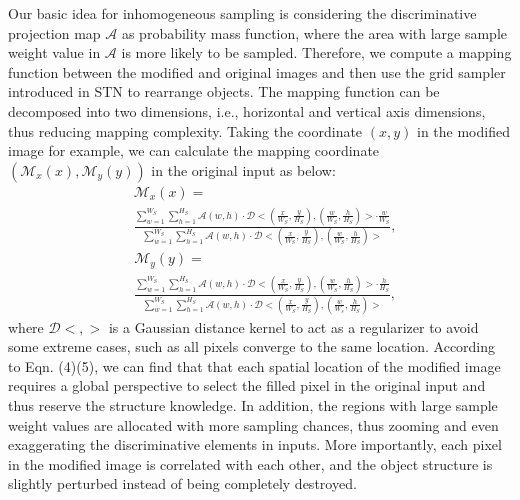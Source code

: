 \documentclass[letterpaper]{article} %
\begin{document}
Our basic idea for inhomogeneous sampling is considering the discriminative projection map $ \mathcal{A} $ as probability mass function, where the area with large sample weight value in $ \mathcal{A} $ is more likely to be sampled. Therefore, we compute a mapping function between the modified and original images and then use the grid sampler introduced in STN \cite{DBLP:conf/nips/JaderbergSZK15} to rearrange objects. The mapping function can be decomposed into two dimensions, i.e., horizontal and vertical axis dimensions, thus reducing mapping complexity. Taking the coordinate $ (x, y) $ in the modified image for example, we can calculate the mapping coordinate $(\mathcal{M}_x(x), \mathcal{M}_y(y))$ in the original input as below:
\begin{equation}
\begin{aligned}
&\mathcal{M}_x(x) =  \\
& \frac{\sum_{w = 1 }^{W_S}\sum_{h = 1 }^{H_S}\mathcal{A}(w, h)\cdot \mathcal{D}<(\frac{x}{W_S},\frac{y}{H_S}),(\frac{w}{W_S},\frac{h}{H_S})> \cdot \frac{w}{W_S}}{\sum_{w = 1 }^{W_S}\sum_{h = 1 }^{H_S}\mathcal{A}(w, h)\cdot \mathcal{D}<(\frac{x}{W_S},\frac{y}{H_S}),(\frac{w}{W_S},\frac{h}{H_S})>},
\end{aligned}
\end{equation}
\begin{equation}
\begin{aligned}
&\mathcal{M}_y(y) = \\ &\frac{\sum_{w = 1 }^{W_S}\sum_{h = 1 }^{H_S}\mathcal{A}(w, h)\cdot \mathcal{D}<(\frac{x}{W_S},\frac{y}{H_S}),(\frac{w}{W_S},\frac{h}{H_S})> \cdot \frac{h}{H_S}}{\sum_{w = 1 }^{W_S}\sum_{h = 1 }^{H_S}\mathcal{A}(w, h)\cdot \mathcal{D}<(\frac{x}{W_S},\frac{y}{H_S}),(\frac{w}{W_s},\frac{h}{H_S})>},
\end{aligned}
\end{equation}
where $ \mathcal{D}<,> $ is a Gaussian distance kernel to act as a regularizer to avoid some extreme cases, such as all pixels converge to the same location. According to Eqn. (4)(5), we can find that that each spatial location of the modified image requires a global perspective to select the filled pixel in the original input and thus reserve the structure knowledge. In addition, the regions with large sample weight values are allocated with more sampling chances, thus zooming and even exaggerating the discriminative elements in inputs. More importantly, each pixel in the modified image is correlated with each other, and the object structure is slightly perturbed instead of being completely destroyed.
\end{document}
